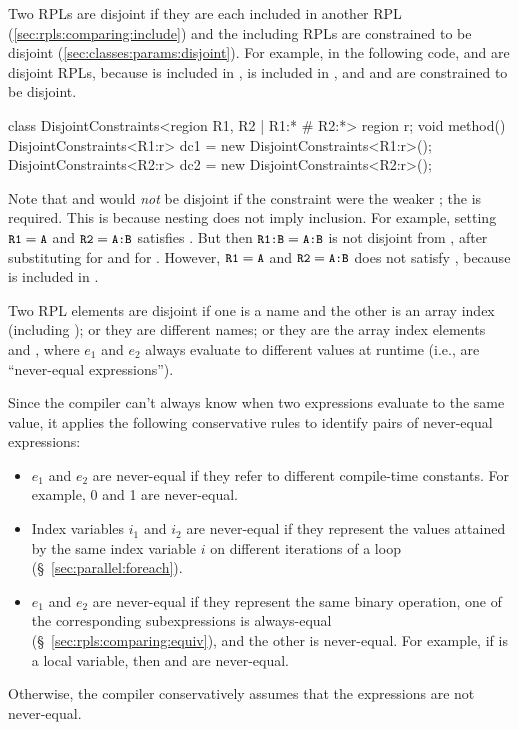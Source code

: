  Two RPLs are disjoint if they are
each included in another RPL (\ref{sec:rpls:comparing:include}) and
the including RPLs are constrained to be disjoint
(\ref{sec:classes:params:disjoint}).  For example, in the following
code,  and  are disjoint RPLs, because 
is included in ,  is included in , and
 and  are constrained to be disjoint.
%
\begin{dpjlisting}
class DisjointConstraints<region R1, R2 | R1:* # R2:*> {
  region r;
  void method() {
    DisjointConstraints<R1:r> dc1 =
    new DisjointConstraints<R1:r>();
    DisjointConstraints<R2:r> dc2 =
    new DisjointConstraints<R2:r>();
  }
}
\end{dpjlisting}

Note that  and  would \emph{not} be disjoint if
the constraint were the weaker ; the \kwd{*} is
required.  This is because nesting does not imply inclusion.  For
example, setting $\mbox{\small{\texttt{R1}}}=\mbox{\small{\texttt{A}}}$ and $\mbox{\small{\texttt{R2}}}=\mbox{\small{\texttt{A:B}}}$ satisfies
.  But then $\mbox{\small{\texttt{R1:B}}}=\mbox{\small{\texttt{A:B}}}$ is not disjoint from
, after substituting  for  and  for
.  However, $\mbox{\small{\texttt{R1}}}=\mbox{\small{\texttt{A}}}$ and $\mbox{\small{\texttt{R2}}}=\mbox{\small{\texttt{A:B}}}$ does
not satisfy , because  is included in
.


 Two RPL elements are disjoint if one
is a name and the other is an array index (including \kwd{[?]}); or
they are different names; or they are the array index elements
\kwd{[$e_1$]} and \kwd{[$e_2$]}, where $e_1$ and $e_2$ always evaluate
to different values at runtime (i.e., are ``never-equal
expressions'').

Since the compiler can't always know when two expressions evaluate to
the same value, it applies the following conservative rules to
identify pairs of never-equal expressions:
%
\begin{itemize}
%
\item $e_1$ and $e_2$ are never-equal if they refer to different
  compile-time constants.  For example, 0 and 1 are never-equal.
%
\item Index variables $i_1$ and $i_2$ are never-equal if they
  represent the values attained by the same index variable $i$ on
  different iterations of a  loop
  (\S~\ref{sec:parallel:foreach}).
%
\item $e_1$ and $e_2$ are never-equal if they represent the same
  binary operation, one of the corresponding subexpressions is
  always-equal (\S~\ref{sec:rpls:comparing:equiv}), and the other is
  never-equal.  For example, if  is a  local
  variable, then  and  are never-equal.
%
\end{itemize}
%
Otherwise, the compiler conservatively assumes that the expressions
are not never-equal.

